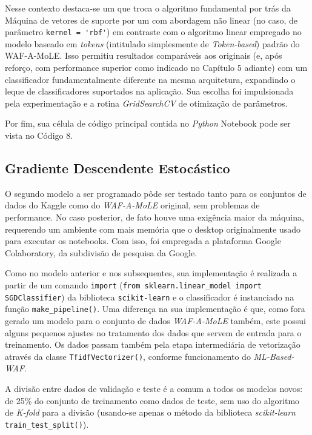 Nesse contexto destaca-se um que troca o algoritmo fundamental por trás da Máquina de vetores de suporte por um com abordagem não linear (no caso, de parâmetro \verb+kernel = 'rbf'+) em contraste com o algoritmo linear empregado no modelo baseado em \textit{tokens} (intitulado simplesmente de \textit{Token-based}) padrão do WAF-A-MoLE. Isso permitiu resultados comparáveis aos originais (e, após reforço, com performance superior como indicado no Capítulo 5 adiante) com um classificador fundamentalmente diferente na mesma arquitetura, expandindo o leque de classificadores suportados na aplicação. Sua escolha foi impulsionada pela experimentação e a rotina \textit{GridSearchCV} de otimização de parâmetros.

Por fim, sua célula de código principal contida no \textit{Python} Notebook pode ser vista no Código 8.

\label{sec:codigos:modelos}
\bigskip

\subsection{Gradiente Descendente Estocástico}
O segundo modelo a ser programado pôde ser testado tanto para os conjuntos de dados do Kaggle como do \textit{WAF-A-MoLE} original, sem problemas de performance. No caso posterior, de fato houve uma exigência maior da máquina, requerendo um ambiente com mais memória que o desktop originalmente usado para executar os notebooks. Com isso, foi empregada a plataforma Google Colaboratory, da subdivisão de pesquisa da Google. 

Como no modelo anterior e nos subsequentes, sua implementação é realizada a partir de um comando \verb+import+ (\verb+from sklearn.linear_model import SGDClassifier+) da biblioteca \verb+scikit-learn+ e o classificador é instanciado na função \verb+make_pipeline()+. Uma diferença na sua implementação é que, como fora gerado um modelo para o conjunto de dados \textit{WAF-A-MoLE} também, este possui alguns pequenos ajustes no tratamento dos dados que servem de entrada para o treinamento. Os dados passam também pela etapa intermediária de vetorização através da classe \verb+TfidfVectorizer()+, conforme funcionamento do \textit{ML-Based-WAF}. 

A divisão entre dados de validação e teste é a comum a todos os modelos novos: de 25\% do conjunto de treinamento como dados de teste, sem uso do algoritmo de \textit{K-fold} para a divisão (usando-se apenas o método da biblioteca \textit{scikit-learn} \verb+train_test_split()+).

